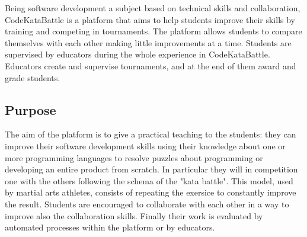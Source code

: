 



%


\setlength{\leftmargini}{5em} %
Being software development a subject based on technical skills and collaboration, CodeKataBattle is a platform that aims to help students improve their skills by training and competing in tournaments. 
The platform allows students to compare themselves with each other making little improvements at a time. 
Students are supervised by educators during the whole experience in CodeKataBattle. 
Educators create and supervise tournaments, and at the end of them award and grade students.
\subsection{Purpose}
The aim of the platform is to give a practical teaching to the students: they can improve their software development skills using their knowledge about one or
more programming languages to resolve puzzles about programming or developing an entire product from scratch. In particular they will in competition one with the 
others following the schema of the "kata battle". This model, used by martial arts athletes, consists of repeating the exersice to constantly improve the result. 
Students are encouraged to collaborate with each other in a way to improve also the collaboration skills. Finally their work is evaluated by automated processes 
within the platform or by educators.
